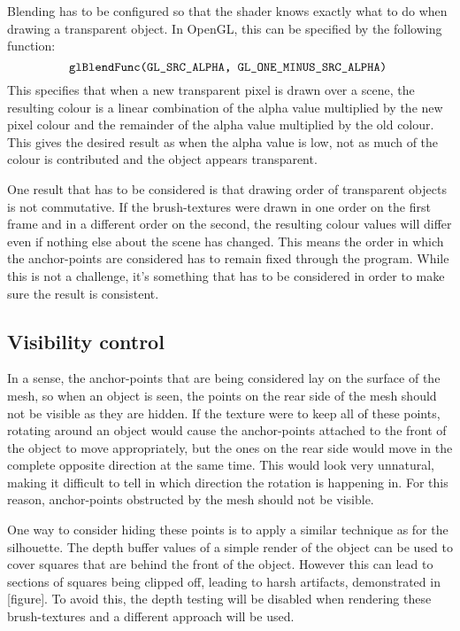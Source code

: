 \documentclass[a4paper, 12pt]{article}
\begin{document}
Blending has to be configured so that the shader knows exactly what to do when drawing a transparent object. In OpenGL, this can be specified by the following function:
$$\texttt{glBlendFunc(GL\_SRC\_ALPHA, GL\_ONE\_MINUS\_SRC\_ALPHA)\;}$$
This specifies that when a new transparent pixel is drawn over a scene, the resulting colour is a linear combination of the alpha value multiplied by the new pixel colour and the remainder of the alpha value multiplied by the old colour. This gives the desired result as when the alpha value is low, not as much of the colour is contributed and the object appears transparent.

One result that has to be considered is that drawing order of transparent objects is not commutative. If the brush-textures were drawn in one order on the first frame and in a different order on the second, the resulting colour values will differ even if nothing else about the scene has changed. This means the order in which the anchor-points are considered has to remain fixed through the program. While this is not a challenge, it's something that has to be considered in order to make sure the result is consistent.


\subsection{Visibility control}
In a sense, the anchor-points that are being considered lay on the surface of the mesh, so when an object is seen, the points on the rear side of the mesh should not be visible as they are hidden. If the texture were to keep all of these points, rotating around an object would cause the anchor-points attached to the front of the object to move appropriately, but the ones on the rear side would move in the complete opposite direction at the same time. This would look very unnatural, making it difficult to tell in which direction the rotation is happening in. For this reason, anchor-points obstructed by the mesh should not be visible.

One way to consider hiding these points is to apply a similar technique as for the silhouette. The depth buffer values of a simple render of the object can be used to cover squares that are behind the front of the object. However this can lead to sections of squares being clipped off, leading to harsh artifacts, demonstrated in [figure]. To avoid this, the depth testing will be disabled when rendering these brush-textures and a different approach will be used.
\end{document}
